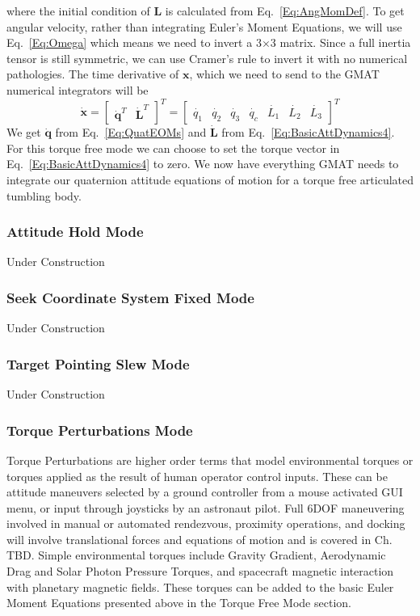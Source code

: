 %
where the initial condition of $\mathbf{L}$ is calculated from
Eq.~\ref{Eq:AngMomDef}.  To get angular velocity, rather than integrating Euler's
Moment Equations, we will use Eq.~\ref{Eq:Omega} which means we need to invert a
3$\times$3 matrix.  Since a full inertia tensor is still symmetric, we can use
Cramer's rule to invert it with no numerical pathologies.  The time derivative
of $\mathbf{x}$, which we need to send to the GMAT numerical integrators will be
%
\begin{equation}
	\mathbf{\dot{x}} =
        \begin{bmatrix}
            \boldsymbol{\dot{q}}^T & \mathbf{\dot{L}}^T
        \end{bmatrix}^T
        =
        \begin{bmatrix}
            \dot{q_1} & \dot{q_2} & \dot{q_3} & \dot{q_c} & \dot{L_1} & \dot{L_2} & \dot{L_3}
        \end{bmatrix}^T
    \label{Eq:QuatStateVecDot}
\end{equation}
%
We get $\mathbf{\dot{q}}$ from Eq.~\ref{Eq:QuatEOMs} and $\mathbf{\dot{L}}$ from
Eq.~\ref{Eq:BasicAttDynamics4}. For this torque free mode we can choose to set
the torque vector in Eq.~\ref{Eq:BasicAttDynamics4} to zero.  We now have
everything GMAT needs to integrate our quaternion attitude equations of motion
for a torque free articulated tumbling body.

\subsubsection{Attitude Hold Mode}
Under Construction

\subsubsection{Seek Coordinate System Fixed Mode}
Under Construction

\subsubsection{Target Pointing Slew Mode}
Under Construction

\subsubsection{Torque Perturbations Mode}
Torque Perturbations are higher order terms that model environmental torques or
torques applied as the result of human operator control inputs.  These can be
attitude maneuvers selected by a ground controller from a mouse activated GUI
menu, or input through joysticks by an astronaut pilot.  Full 6DOF maneuvering
involved in manual or automated rendezvous, proximity operations, and docking
will involve translational forces and equations of motion and is covered in
Ch. TBD.  Simple environmental torques include Gravity Gradient, Aerodynamic Drag
and Solar Photon Pressure Torques, and spacecraft magnetic interaction with
planetary magnetic fields.  These torques can be added to the basic Euler Moment
Equations presented above in the Torque Free Mode section.


